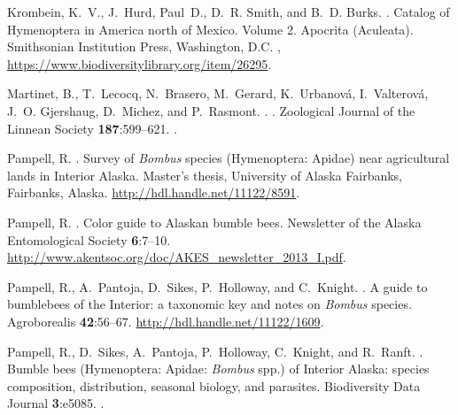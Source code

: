 \begin{multicols}{2}
\begin{thebibliography}{24}
Krombein, K.~V., J.~Hurd, Paul~D., D.~R. Smith, and B.~D. Burks.
.
\newblock Catalog of Hymenoptera in America north of Mexico. Volume 2. Apocrita
  (Aculeata).
\newblock Smithsonian Institution Press, Washington, D.C.
\newblock {},
  \urlprefix\url{https://www.biodiversitylibrary.org/item/26295}.

Martinet, B., T.~Lecocq, N.~Brasero, M.~Gerard, K.~Urbanová, I.~Valterová,
  J.~O. Gjershaug, D.~Michez, and P.~Rasmont.
.
.
\newblock Zoological Journal of the Linnean Society {\bfseries 187}:599--621.
\newblock {}.

Pampell, R.
.
\newblock Survey of \textit{Bombus} species (Hymenoptera: Apidae) near
  agricultural lands in Interior Alaska.
\newblock Master's thesis, University of Alaska Fairbanks, Fairbanks, Alaska.
\newblock \urlprefix\url{http://hdl.handle.net/11122/8591}.

Pampell, R.
.
\newblock Color guide to Alaskan bumble bees.
\newblock Newsletter of the Alaska Entomological Society {\bfseries 6}:7--10.
\newblock
  \urlprefix\url{http://www.akentsoc.org/doc/AKES_newsletter_2013_I.pdf}.

Pampell, R., A.~Pantoja, D.~Sikes, P.~Holloway, and C.~Knight.
.
\newblock A guide to bumblebees of the Interior: a taxonomic key and notes on
  \textit{Bombus} species.
\newblock Agroborealis {\bfseries 42}:56--67.
\newblock \urlprefix\url{http://hdl.handle.net/11122/1609}.

Pampell, R., D.~Sikes, A.~Pantoja, P.~Holloway, C.~Knight, and R.~Ranft.
.
\newblock Bumble bees (Hymenoptera: Apidae: \textit{Bombus} spp.) of Interior
  Alaska: species composition, distribution, seasonal biology, and parasites.
\newblock Biodiversity Data Journal {\bfseries 3}:e5085.
\newblock {}.


\end{thebibliography}
\end{multicols}
